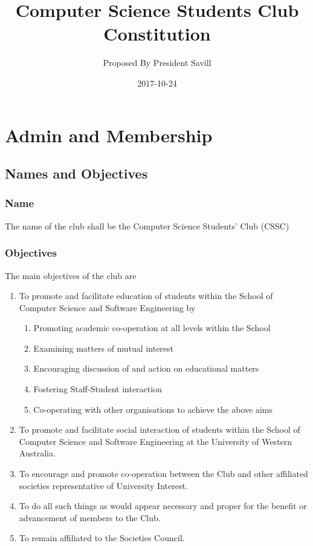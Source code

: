\documentclass[10pt,a4paper]{report}
\author{Proposed By President Savill}
\date{2017-10-24}
\title{Computer Science Students Club Constitution}
\begin{document}
	\maketitle
	\newpage
	\begin{small}
		\tableofcontents
	\end{small}
	\newpage
	
	\chapter{Admin and Membership}
	
	\section{Names and Objectives}
		\subsection{Name}
			The name of the club shall be the Computer Science Students' Club (CSSC)
			
		\subsection{Objectives}
		The main objectives of the club are
			\begin{enumerate}[label=\alph*]
				\item To promote and facilitate education of students within the School of Computer Science and Software Engineering by
				\begin{enumerate}[label=\roman*]
					\item Promoting academic co-operation at all levels within the School
					\item Examining matters of mutual interest
					\item Encouraging discussion of and action on educational matters
					\item Fostering Staff-Student interaction
					\item Co-operating with other organisations to achieve the above aims
				\end{enumerate}
				\item To promote and facilitate social interaction of students within the School of Computer Science and Software Engineering at the University of Western Australia.
				\item To encourage and promote co-operation between the Club and other affiliated societies representative of University Interest.
				\item To do all such things as would appear necessary and proper for the benefit or advancement of members to the Club.
				\item To remain affiliated to the Societies Council.
			\end{enumerate}
	
\end{document}
